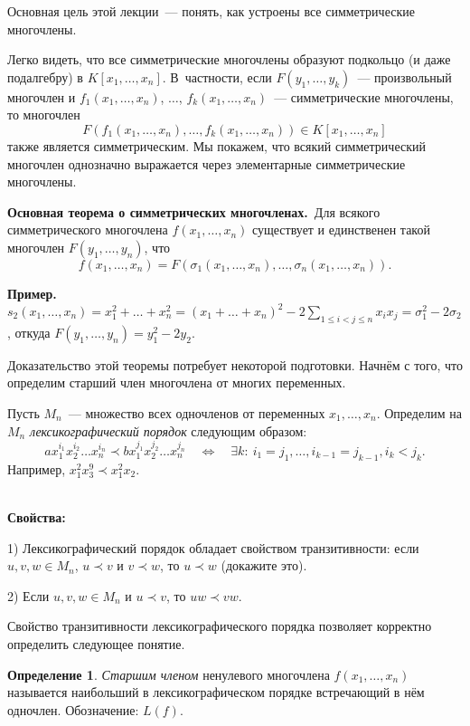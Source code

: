 \documentclass[a4paper,10pt]{amsart}
\theoremstyle{definition}
\newtheorem{definition}{Определение}
\theoremstyle{remark}
\begin{document}
Основная цель этой лекции~--- понять, как устроены все
симметрические многочлены.

Легко видеть, что все симметрические многочлены образуют подкольцо
(и даже подалгебру) в $K[x_1, \ldots, x_n]$. В~частности, если
$F(y_1, \ldots, y_k)$~--- произвольный многочлен и $f_1(x_1, \ldots,
x_n)$, $\ldots$, $f_k(x_1, \ldots, x_n)$~--- симметрические
многочлены, то многочлен
$$
F(f_1(x_1, \ldots, x_n), \ldots, f_k(x_1, \ldots, x_n)) \in K[x_1,
\ldots, x_n]
$$
также является симметрическим. Мы покажем, что всякий симметрический
многочлен однозначно выражается через элементарные симметрические
многочлены.

\medskip

{\bf Основная теорема о симметрических многочленах.}\ Для всякого
симметрического многочлена $f(x_1, \ldots, x_n)$ существует и
единственен такой многочлен $F(y_1, \ldots, y_n)$, что
$$
f(x_1, \ldots, x_n) = F(\sigma_1(x_1, \ldots, x_n), \ldots,
\sigma_n(x_1, \ldots, x_n)).
$$

\textbf{Пример.} $s_2(x_1, \ldots, x_n) = x_1^2 + \ldots + x_n^2 =
(x_1 + \ldots + x_n)^2 - 2\sum \limits_{1 \leqslant i < j \leqslant
	n} x_i x_j = \sigma_1^2 - 2\sigma_2$, откуда $F(y_1, \ldots, y_n) =
y_1^2 - 2y_2$.


Доказательство этой теоремы потребует некоторой подготовки. Начнём с
того, что определим старший член многочлена от многих переменных.

Пусть $M_n$~--- множество всех одночленов от переменных $x_1,
\ldots, x_n$. Определим на $M_n$ {\it лексикографический порядок}
следующим образом:
$$
ax_1^{i_1}x_2^{i_2}\ldots x_n^{i_n} \prec bx_1^{j_1}x_2^{j_2}\ldots
x_n^{j_n} \quad \Leftrightarrow \quad \exists k: \: i_1=j_1,\ldots,
i_{k-1}=j_{k-1}, i_k<j_k.
$$
Например, $x_1^2x_3^9 \prec x_1^2x_2$.

\ \\
\textbf{Свойства:}

1) Лексикографический порядок обладает свойством
транзитивности: если $u,v,w \in M_n$, $u \prec v$ и $v \prec w$, то
$u \prec w$ (докажите это).

2) Если $u,v,w \in M_n$ и $u \prec v$, то $uw \prec vw$.

Свойство транзитивности лексикографического порядка позволяет
корректно определить следующее понятие.

\begin{definition}
	{\it Старшим членом} ненулевого многочлена $f(x_1,\ldots,x_n)$
	называется наибольший в лексикографическом порядке встречающий в нём
	одночлен. Обозначение: $L(f)$.
\end{definition}
\end{document}
